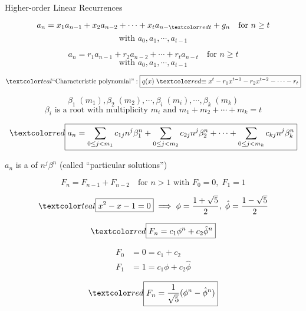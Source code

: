 \begin{frame}{}
  \begin{center}
    {\Large Higher-order Linear Recurrences}
  \end{center}

  \[
    a_n = x_1 a_{n-1} + x_2 a_{n-2} + \cdots + x_t a_{n-\red{t}} + g_{n} \quad \text{for } n \ge t
  \]
  \[
    \text{with } a_0, a_1, \cdots, a_{t-1}
  \]
\end{frame}

\begin{frame}{}
  \begin{theorem}
    \[
      a_n = r_1 a_{n-1} + r_2 a_{n-2} + \cdots + r_t a_{n-t} \quad \text{for } n \ge t
    \]
    \[
      \text{with } a_0, a_1, \cdots, a_{t-1}
    \]

    \pause
    \vspace{-0.30cm}
    \[
      \teal{\text{``Characteristic polynomial''}: 
      \boxed{q(x) \;\red{\equiv}\; x^t - r_1 x^{t-1} - r_2 x^{t-2} - \cdots - r_t}}
    \]

    \pause
    \[
      \beta_1\; (m_1), \beta_2\; (m_2), \cdots, \beta_i\; (m_i), \cdots, \beta_{k}\; (m_k)
    \]
    \[
      \beta_{i} \text{ is a root with multiplicity } m_i \text{ and } m_1 + m_2 + \cdots + m_k = t
    \]

    \pause
    \vspace{-0.30cm}
    \[
      \red{\boxed{a_n = \sum_{0 \le j < m_1} c_{1j} n^j \beta_{1}^{n} 
        + \sum_{0 \le j < m_2} c_{2j} n^j \beta_{2}^{n} + \cdots 
        + \sum_{0 \le j < m_k} c_{kj} n^j \beta_{k}^{n}}}
    \]
    \begin{center}
      $a_n$ is a  of $n^{j} \beta^{n}$ (called ``particular solutions'')
    \end{center}
  \end{theorem}
\end{frame}

\begin{frame}{}
  \[
    F_{n} = F_{n-1} + F_{n-2} \quad \text{for } n > 1 \text{ with } F_{0} = 0,\; F_{1} = 1
  \]

  \pause
  \[
    \teal{\boxed{x^2 - x - 1 = 0}} \implies 
    \phi = \frac{1 + \sqrt{5}}{2},\; \hat{\phi} = \frac{1 - \sqrt{5}}{2}
  \]

  \pause
  \[
    \red{\boxed{F_n = c_1 \phi^{n} + c_2 \hat{\phi}^{n}}}
  \]

  \pause
  \begin{align*}
    F_0 &= 0 = c_1 + c_2 \\
    F_1 &= 1 = c_1 \phi + c_2 \hat{\phi}
  \end{align*}

  \pause
  \[
    \red{\boxed{F_n = \frac{1}{\sqrt{5}} (\phi^{n} - {\hat{\phi}}^{n})}}
  \]
\end{frame}

